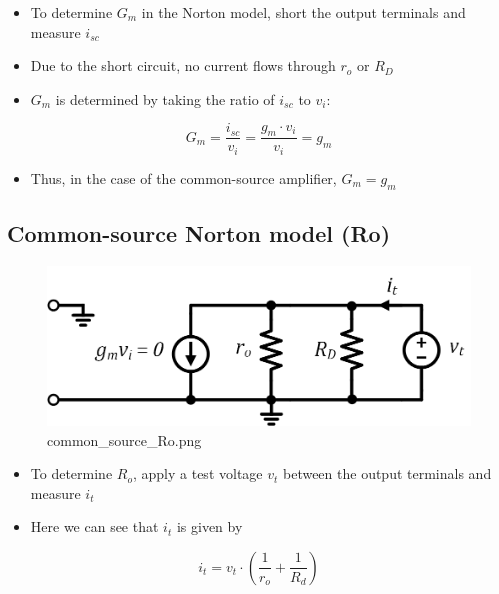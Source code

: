 \documentclass[11pt]{article}
\providecommand{\tightlist}{%
      \setlength{\itemsep}{0pt}\setlength{\parskip}{0pt}}
\begin{document}
    \begin{itemize}
\tightlist
\item
  To determine \(G_m\) in the Norton model, short the output terminals
  and measure \(i_{sc}\)
\item
  Due to the short circuit, no current flows through \(r_o\) or \(R_D\)
\item
  \(G_m\) is determined by taking the ratio of \(i_{sc}\) to \(v_i\):
\end{itemize}

\begin{equation}
G_m = \dfrac{i_{sc}}{v_i} = \dfrac{g_m \cdot v_i}{v_i}= g_m
\end{equation}

\begin{itemize}
\tightlist
\item
  Thus, in the case of the common-source amplifier, \(G_m = g_m\)
\end{itemize}

    \hypertarget{common-source-norton-model-ro}{%
\subsection{Common-source Norton model
(Ro)}\label{common-source-norton-model-ro}}

    \begin{figure}
\centering
\includegraphics{common_source_Ro.png}
\caption{common\_source\_Ro.png}
\end{figure}

    \begin{itemize}
\tightlist
\item
  To determine \(R_o\), apply a test voltage \(v_t\) between the output
  terminals and measure \(i_t\)
\item
  Here we can see that \(i_t\) is given by
\end{itemize}

\begin{equation}
i_t = v_t \cdot \left(\dfrac{1}{r_o} + \dfrac{1}{R_d} \right)
\end{equation}
\end{document}
